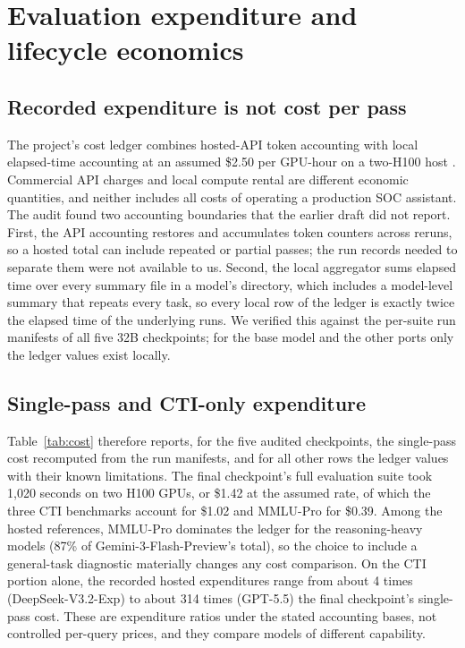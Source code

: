 \documentclass[preprint,12pt,authoryear]{elsarticle}
\begin{document}
\section{Evaluation expenditure and lifecycle economics}\label{sec:cost}
\subsection{Recorded expenditure is not cost per pass}
The project's cost ledger combines hosted-API token accounting with local elapsed-time accounting at an assumed \$2.50 per GPU-hour on a two-H100 host \citep{glaukopis2026software}. Commercial API charges and local compute rental are different economic quantities, and neither includes all costs of operating a production SOC assistant. The audit found two accounting boundaries that the earlier draft did not report. First, the API accounting restores and accumulates token counters across reruns, so a hosted total can include repeated or partial passes; the run records needed to separate them were not available to us. Second, the local aggregator sums elapsed time over every summary file in a model's directory, which includes a model-level summary that repeats every task, so every local row of the ledger is exactly twice the elapsed time of the underlying runs. We verified this against the per-suite run manifests of all five 32B checkpoints; for the base model and the other ports only the ledger values exist locally.

\subsection{Single-pass and CTI-only expenditure}
Table~\ref{tab:cost} therefore reports, for the five audited checkpoints, the single-pass cost recomputed from the run manifests, and for all other rows the ledger values with their known limitations. The final checkpoint's full evaluation suite took 1,020 seconds on two H100 GPUs, or \$1.42 at the assumed rate, of which the three CTI benchmarks account for \$1.02 and MMLU-Pro for \$0.39. Among the hosted references, MMLU-Pro dominates the ledger for the reasoning-heavy models (87\% of Gemini-3-Flash-Preview's total), so the choice to include a general-task diagnostic materially changes any cost comparison. On the CTI portion alone, the recorded hosted expenditures range from about 4 times (DeepSeek-V3.2-Exp) to about 314 times (GPT-5.5) the final checkpoint's single-pass cost. These are expenditure ratios under the stated accounting bases, not controlled per-query prices, and they compare models of different capability.
\end{document}
